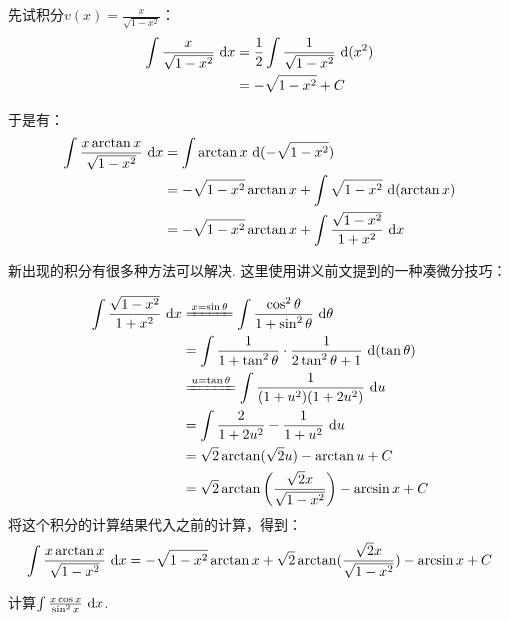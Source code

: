 \begin{solution}
先试积分$v(x)=\frac{x}{\sqrt{1-x^2}}$：
\begin{equation}
    \begin{aligned}
        \int \frac{x}{\sqrt{1-x^2}} ~\mathrm{d} x
        &= \frac{1}{2} \int \frac{1}{\sqrt{1-x^2}} ~\mathrm{d} (x^2) \\
        &= - \sqrt{1-x^2}+ C
        \nonumber
    \end{aligned}
\end{equation} \par
于是有：
\begin{equation}
    \begin{aligned}
        \int \frac{x \arctan x}{\sqrt{1-x^2}}~\mathrm{d} x
        &= \int \arctan x ~\mathrm{d} (-\sqrt{1-x^2}) \\
        &= -\sqrt{1-x^2}\arctan x +\int \sqrt{1-x^2} ~\mathrm{d}(\arctan x) \\
        &= -\sqrt{1-x^2}\arctan x +\int \frac{\sqrt{1-x^2}}{1+x^2} ~\mathrm{d} x
        \nonumber
    \end{aligned}
\end{equation} \par
新出现的积分有很多种方法可以解决. 这里使用讲义前文提到的一种凑微分技巧：

\begin{equation}
    \begin{aligned}
        \int \frac{\sqrt{1-x^2}}{1+x^2} ~\d x
        &\xlongequal{x = \sin \theta} \int \frac {\cos^2 \theta}{1+\sin^2 \theta}~\d \theta \\
        &= \int \frac{1}{1 + \tan^2 \theta} \cdot \frac{1}{2\tan^2 \theta + 1}  ~\d (\tan \theta) \\
        &\xlongequal{u=\tan \theta} \int \frac{1}{(1+u^2)(1+2u^2)}~\d u \\
        &= \int \frac{2}{1+2u^2} -\frac{1}{1+u^2} ~\d u \\
        &= \sqrt{2} \arctan(\sqrt{2}u) -\arctan{u} +C \\
        &= \sqrt{2} \arctan \left( \frac{\sqrt{2}x}{\sqrt{1-x^2}} \right) -\arcsin x +C
        \nonumber
    \end{aligned}
\end{equation}
将这个积分的计算结果代入之前的计算，得到：
$$
\int \frac{x \arctan x}{\sqrt{1-x^2}}~\mathrm{d} x = -\sqrt{1-x^2}\arctan x
+\sqrt{2} \arctan(\frac{\sqrt{2}x}{\sqrt{1-x^2}}) -\arcsin x +C
$$
\end{solution}

\begin{example}
\label{ex:ch03-25}
计算$\int \frac{x \cos x}{\sin^2 x}~\mathrm{d} x$.
\end{example}

